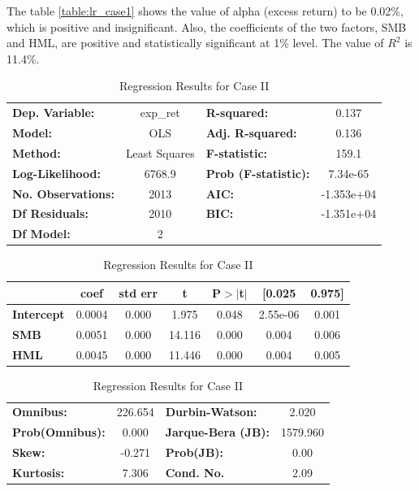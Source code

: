 The table \ref{table:lr_case1} shows the value of alpha (excess return) to be 0.02\%, which is positive and insignificant. Also, the coefficients of the two factors, SMB and HML, are positive and statistically significant at 1\% level. The value of $R^2$ is 11.4\%.

\begin{table}
\centering
\begin{tabular}{|lc|lc|}
\hline
\textbf{Dep. Variable:}    &     exp\_ret      & \textbf{  R-squared:         } &     0.137   \\
\textbf{Model:}            &       OLS        & \textbf{  Adj. R-squared:    } &     0.136   \\
\textbf{Method:}           &  Least Squares   & \textbf{  F-statistic:       } &     159.1   \\
\textbf{Log-Likelihood:} &    6768.9 & \textbf{  Prob (F-statistic):} &  7.34e-65   \\
\textbf{No. Observations:} &        2013      & \textbf{  AIC:               } & -1.353e+04  \\
\textbf{Df Residuals:}     &        2010      & \textbf{  BIC:               } & -1.351e+04  \\
\textbf{Df Model:}         &           2      & \textbf{                     } &             \\
\hline
\end{tabular}

\bigskip

\begin{tabular}{|l|cccccc|}
\hline

                   & \textbf{coef} & \textbf{std err} & \textbf{t} & \textbf{P$>$$|$t$|$} & \textbf{[0.025} & \textbf{0.975]}  \\
\hline
\textbf{Intercept} &       0.0004  &        0.000     &     1.975  &         0.048        &     2.55e-06    &        0.001     \\
\textbf{SMB}       &       0.0051  &        0.000     &    14.116  &         0.000        &        0.004    &        0.006     \\
\textbf{HML}       &       0.0045  &        0.000     &    11.446  &         0.000        &        0.004    &        0.005     \\
\hline
\end{tabular}

\bigskip

\begin{tabular}{|lc|lc|}
\hline
\textbf{Omnibus:}       & 226.654 & \textbf{  Durbin-Watson:     } &    2.020  \\
\textbf{Prob(Omnibus):} &   0.000 & \textbf{  Jarque-Bera (JB):  } & 1579.960  \\
\textbf{Skew:}          &  -0.271 & \textbf{  Prob(JB):          } &     0.00  \\
\textbf{Kurtosis:}      &   7.306 & \textbf{  Cond. No.          } &     2.09  \\
\hline
\end{tabular}
\caption{Regression Results for Case II}
\label{table:lr_case2}
\end{table}

